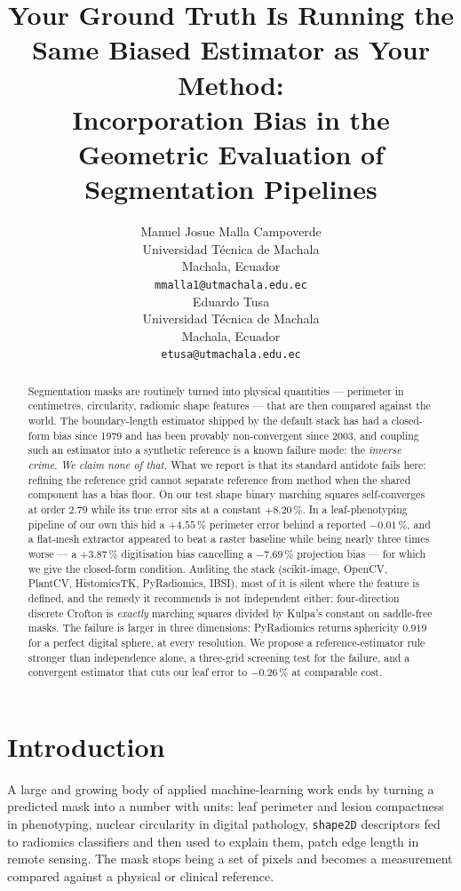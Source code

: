 \documentclass{article}
\title{Your Ground Truth Is Running the Same Biased Estimator as Your Method:\\
       Incorporation Bias in the Geometric Evaluation of Segmentation Pipelines}
\author{%
  Manuel Josue Malla Campoverde \\
  Universidad T\'ecnica de Machala \\
  Machala, Ecuador \\
  \texttt{mmalla1@utmachala.edu.ec} \\
  \And
  Eduardo Tusa \\
  Universidad T\'ecnica de Machala \\
  Machala, Ecuador \\
  \texttt{etusa@utmachala.edu.ec} \\
}
\newcommand{\pct}[1]{$#1\,\%$}
\begin{document}
\maketitle

\begin{abstract}
Segmentation masks are routinely turned into physical quantities --- perimeter in centimetres,
circularity, radiomic shape features --- that are then compared against the world. The
boundary-length estimator shipped by the default stack has had a closed-form bias since 1979 and has
been provably non-convergent since 2003, and coupling such an estimator into a synthetic reference
is a known failure mode: the \emph{inverse crime}. \emph{We claim none of that.} What we report is
that its standard antidote fails here: refining the reference grid cannot separate reference from
method when the shared component has a bias floor. On our test shape binary marching squares
self-converges at order $2.79$ while its true error sits at a constant \pct{+8.20}. In a
leaf-phenotyping pipeline of our own this hid a \pct{+4.55} perimeter error behind a reported
\pct{-0.01}, and a flat-mesh extractor appeared to beat a raster baseline while being nearly three
times worse --- a \pct{+3.87} digitisation bias cancelling a \pct{-7.69} projection bias --- for
which we give the closed-form condition. Auditing the stack (scikit-image, OpenCV, PlantCV,
HistomicsTK, PyRadiomics, IBSI), most of it is silent where the feature is defined, and the remedy
it recommends is not independent either: four-direction discrete Crofton is \emph{exactly} marching
squares divided by Kulpa's constant on saddle-free masks. The failure is larger in three dimensions:
PyRadiomics returns sphericity $0.919$ for a perfect digital sphere, at every resolution. We propose
a reference-estimator rule stronger than independence alone, a three-grid screening test for the
failure, and a convergent estimator that cuts our leaf error to \pct{-0.26} at comparable cost.
\end{abstract}

\section{Introduction}

A large and growing body of applied machine-learning work ends by turning a predicted mask into a
number with units: leaf perimeter and lesion compactness in phenotyping, nuclear circularity in
digital pathology, \texttt{shape2D} descriptors fed to radiomics classifiers and then used to
explain them, patch edge length in remote sensing. The mask stops being a set of pixels and becomes
a measurement compared against a physical or clinical reference.
\end{document}
